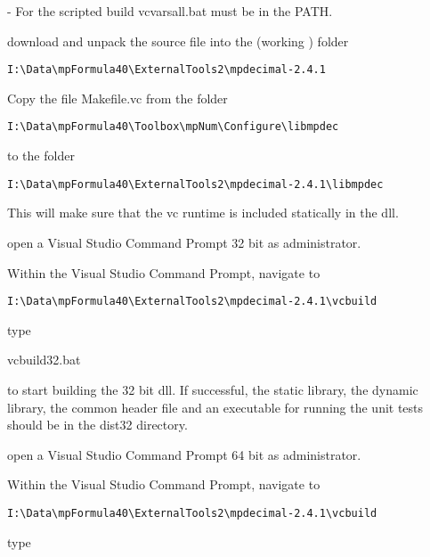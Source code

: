 - For the scripted build vcvarsall.bat must be in the PATH.


download and unpack the source file into the (working ) folder

\begin{verbatim}
I:\Data\mpFormula40\ExternalTools2\mpdecimal-2.4.1
\end{verbatim}




Copy the file Makefile.vc from the folder

\begin{verbatim}
I:\Data\mpFormula40\Toolbox\mpNum\Configure\libmpdec
\end{verbatim}



to the folder

\begin{verbatim}
I:\Data\mpFormula40\ExternalTools2\mpdecimal-2.4.1\libmpdec
\end{verbatim}



This will make sure that the vc runtime is included statically in the dll.



open a Visual Studio Command Prompt 32 bit as administrator.

Within the Visual Studio Command Prompt, navigate to

\begin{verbatim}
I:\Data\mpFormula40\ExternalTools2\mpdecimal-2.4.1\vcbuild
\end{verbatim}



type 

vcbuild32.bat

to start building the 32 bit dll. If successful, the static library, the dynamic
library, the common header file and an executable for running the
unit tests should be in the dist32 directory.





open a Visual Studio Command Prompt 64 bit as administrator.

Within the Visual Studio Command Prompt, navigate to

\begin{verbatim}
I:\Data\mpFormula40\ExternalTools2\mpdecimal-2.4.1\vcbuild
\end{verbatim}



type 

